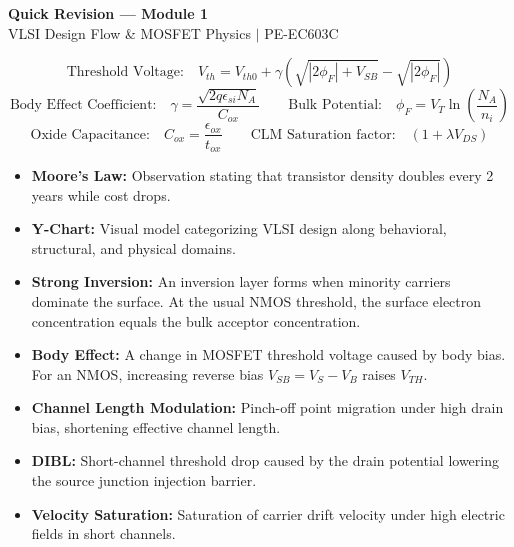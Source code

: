 \documentclass[12pt,a4paper]{article}
\begin{document}
\newpage
\begin{center}
  {\large\bfseries\color{myred} Quick Revision --- Module 1}\\[3pt]
  {\small\color{mydark} VLSI Design Flow \& MOSFET Physics $|$ PE-EC603C}
\end{center}
\noindent{\color{myred}\rule{\linewidth}{1.2pt}}
\vspace{4pt}

\begin{tcolorbox}[formulabox, title={\textbf{Key Module 1 Formulas}}]
$$\text{Threshold Voltage:} \quad V_{th} = V_{th0} + \gamma \left( \sqrt{|2\phi_F| + V_{SB}} - \sqrt{|2\phi_F|} \right)$$
$$\text{Body Effect Coefficient:} \quad \gamma = \frac{\sqrt{2q\epsilon_{si}N_A}}{C_{ox}} \qquad \text{Bulk Potential:} \quad \phi_F = V_T \ln\left(\frac{N_A}{n_i}\right)$$
$$\text{Oxide Capacitance:} \quad C_{ox} = \frac{\epsilon_{ox}}{t_{ox}} \qquad \text{CLM Saturation factor:} \quad (1 + \lambda V_{DS})$$
\end{tcolorbox}

\begin{tcolorbox}[defbox, title={\textbf{One-Line Definitions}}]
\begin{itemize}[leftmargin=*, itemsep=2.5pt, topsep=0pt]
  \item \textbf{Moore's Law:} Observation stating that transistor density doubles every 2 years while cost drops.
  \item \textbf{Y-Chart:} Visual model categorizing VLSI design along behavioral, structural, and physical domains.
  \item \textbf{Strong Inversion:} An inversion layer forms when minority carriers dominate the surface. At the usual NMOS threshold, the surface electron concentration equals the bulk acceptor concentration.
  \item \textbf{Body Effect:} A change in MOSFET threshold voltage caused by body bias. For an NMOS, increasing reverse bias $V_{SB}=V_S-V_B$ raises $V_{TH}$.
  \item \textbf{Channel Length Modulation:} Pinch-off point migration under high drain bias, shortening effective channel length.
  \item \textbf{DIBL:} Short-channel threshold drop caused by the drain potential lowering the source junction injection barrier.
  \item \textbf{Velocity Saturation:} Saturation of carrier drift velocity under high electric fields in short channels.
\end{itemize}
\end{tcolorbox}
\end{document}

